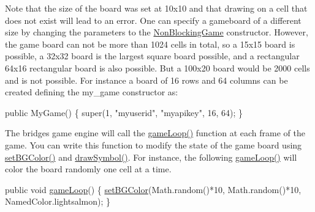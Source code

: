 Note that the size of the board was set at 10x10 and that drawing on a cell that does not exist will lead to an error. One can specify a gameboard of a different size by changing the parameters to the \hyperlink{classbridges_1_1games_1_1_non_blocking_game}{Non\+Blocking\+Game} constructor. However, the game board can not be more than 1024 cells in total, so a 15x15 board is possible, a 32x32 board is the largest square board possible, and a rectangular 64x16 rectangular board is also possible. But a 100x20 board would be 2000 cells and is not possible. For instance a board of 16 rows and 64 columns can be created defining the my\+\_\+game constructor as\+:


\begin{DoxyCode}
\textcolor{keyword}{public} MyGame() \{ super(1, \textcolor{stringliteral}{"myuserid"},  \textcolor{stringliteral}{"myapikey"}, 16, 64); \}
\end{DoxyCode}


The bridges game engine will call the \hyperlink{classbridges_1_1games_1_1_game_base_a56d05ed744791cfc1c3792f39ff438f1}{game\+Loop()} function at each frame of the game. You can write this function to modify the state of the game board using \hyperlink{classbridges_1_1games_1_1_game_base_a7b4d08cdb306a5bf7104ab5315acb414}{set\+B\+G\+Color()} and \hyperlink{classbridges_1_1games_1_1_game_base_a03e8446feb00d5957a7e160a4fa76342}{draw\+Symbol()}. For instance, the following \hyperlink{classbridges_1_1games_1_1_game_base_a56d05ed744791cfc1c3792f39ff438f1}{game\+Loop()} will color the board randomly one cell at a time.


\begin{DoxyCode}
\textcolor{keyword}{public} \textcolor{keywordtype}{void} \hyperlink{classbridges_1_1games_1_1_game_base_a56d05ed744791cfc1c3792f39ff438f1}{gameLoop}() \{
  \hyperlink{classbridges_1_1games_1_1_game_base_a7b4d08cdb306a5bf7104ab5315acb414}{setBGColor}(Math.random()*10, Math.random()*10, NamedColor.lightsalmon);
\}
\end{DoxyCode}


